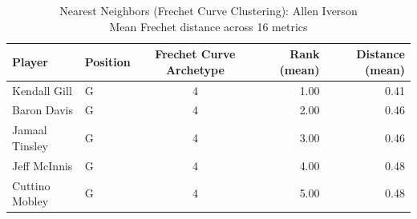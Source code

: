 \begin{table}[t]
\caption*{
{\fontsize{20}{25} Nearest Neighbors (Frechet Curve Clustering): Allen Iverson\fontsize{12}{15}\selectfont } \\ 
{\fontsize{14}{17}\selectfont  Mean Frechet distance across 16 metrics\fontsize{12}{15}\selectfont }
} 
\fontsize{12.0pt}{14.0pt}\selectfont
\begin{tabular*}{\linewidth}{@{\extracolsep{\fill}}llcrr}
\toprule
Player & Position & Frechet Curve Archetype & Rank (mean) & Distance (mean) \\ 
\midrule\addlinespace[2.5pt]
Kendall Gill & G & 4 & 1.00 & 0.41 \\ 
Baron Davis & G & 4 & 2.00 & 0.46 \\ 
Jamaal Tinsley & G & 4 & 3.00 & 0.46 \\ 
Jeff McInnis & G & 4 & 4.00 & 0.48 \\ 
Cuttino Mobley & G & 4 & 5.00 & 0.48 \\ 
\bottomrule
\end{tabular*}
\end{table}

